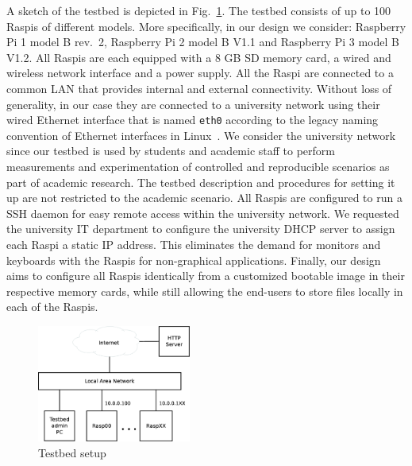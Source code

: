 \label{sec:overview}

A sketch of the testbed is depicted in Fig.~\ref{fig:testbed_setup}.
The testbed consists of up to 100 \ac{Raspi}s of different models.
More specifically, in our design we consider: Raspberry Pi 1 model B rev.~2,
Raspberry Pi 2 model B V1.1 and Raspberry Pi 3 model B V1.2.
All \ac{Raspi}s are each equipped with a 8 GB \ac{SD} memory card, a wired and wireless
network interface and a power supply. All the \ac{Raspi} are connected to
a common \ac{LAN} that provides internal and external connectivity. Without
loss of generality, in our case they are connected to a university network
using their wired Ethernet interface that is named \texttt{eth0} according
to the legacy naming convention of Ethernet interfaces in
Linux~\cite{PredictableNetworkInterfaceNames}. We consider the
university network since our testbed is used by students and academic staff
to perform measurements and experimentation of controlled and
reproducible scenarios as part of academic research. The
testbed description and procedures for setting it up are not restricted
to the academic scenario. All \ac{Raspi}s are configured to run
a \ac{SSH} daemon for easy remote access within the university network.
We requested the university \ac{IT} department to configure the university
\ac{DHCP} server to assign each \ac{Raspi} a static \ac{IP} address. This
eliminates the demand for monitors and keyboards with the \ac{Raspi}s
for non-graphical applications. Finally, our design aims to configure all
\ac{Raspi}s identically from a customized bootable image in their
respective memory cards, while still allowing the end-users to store
files locally in each of the \ac{Raspi}s.

\begin{figure}[ht!]
\centering
\includegraphics[width=0.45\textwidth]{images/testbed_setup3.eps}
\caption{Testbed setup}
\label{fig:testbed_setup}
\end{figure}


